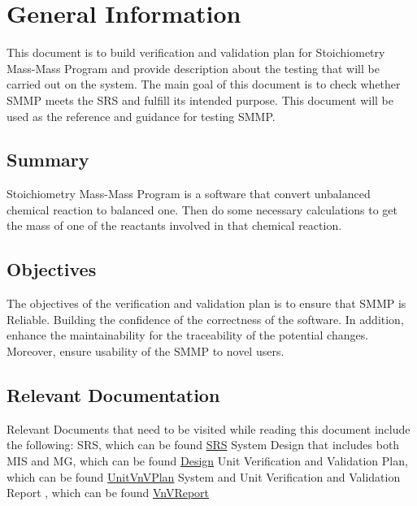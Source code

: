 \documentclass[12pt, titlepage]{article}
\begin{document}
\section{General Information}

This document is to build verification and validation plan for Stoichiometry Mass-Mass Program and provide description about the testing that will be carried out on the system. The main goal of this document is to check whether SMMP meets the SRS and fulfill its intended purpose. This document will be used as the reference and guidance for testing SMMP.

\subsection{Summary}

Stoichiometry Mass-Mass Program is a software that convert unbalanced chemical reaction to balanced one. Then do some necessary calculations to get the mass of one of the reactants involved in that chemical reaction.

\subsection{Objectives}

The objectives of the verification and validation plan is to ensure that SMMP is Reliable. Building the confidence of the correctness of the software. In addition, enhance the maintainability for the traceability of the potential changes. Moreover, ensure usability of the SMMP to novel users. 

\subsection{Relevant Documentation}

Relevant Documents that need to be visited while reading this document include the following:
\newline
SRS, which can be found  \href{https://github.com/deemaalomair1/CAS741_project/tree/master/docs/SRS}{SRS} \cite{SoftwareSpecification}
\newline
System Design that includes both MIS and MG, which can be found \href{https://github.com/deemaalomair1/CAS741project/tree/master/docs/Design}{Design} \cite{Designdocument}
\newline
Unit Verification and Validation Plan,  which can be found \href{https://github.com/deemaalomair1/CAS741project/tree/master/docs/VnVPlan/UnitVnVPlan}{UnitVnVPlan} \cite{UnitVnVPlan}
\newline
System and Unit Verification and Validation Report ,  which can be found \href{https://github.com/deemaalomair1/CAS741project/tree/master/docs/VnVReport}{VnVReport} \cite{VnVReport}
\end{document}
